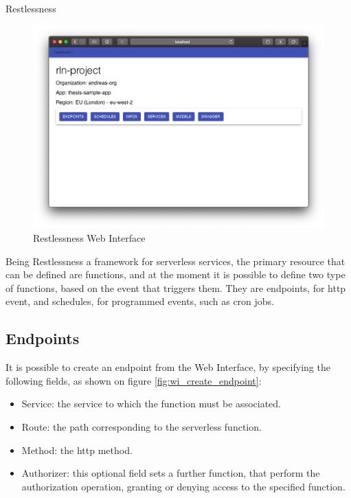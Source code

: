 \begin{chapter}{Restlessness}
    \begin{figure}
        \centering
        \includegraphics[width=\linewidth]{source/images/rln-web-interface.png}
        \caption{Restlessness Web Interface}
        \label{fig:rln_web_interface}
    \end{figure}

    Being Restlessness a framework for serverless services, the primary resource that
    can be defined are functions, and at the moment it is possible to define two type
    of functions, based on the event that triggers them. They are endpoints, for http
    event, and schedules, for programmed events, such as cron jobs.

    \subsection{Endpoints}
    \label{subsec:endpoints}
    It is possible to create an endpoint from the Web Interface, by specifying the
    following fields, as shown on figure \ref{fig:wi_create_endpoint}:
    \begin{itemize}
        \item Service: the service to which the function must be associated.
        \item Route: the path corresponding to the serverless function.
        \item Method: the http method.
        \item Authorizer: this optional field sets a further function, that
            perform the authorization operation, granting or denying access to
            the specified function. %
    \end{itemize}


\end{chapter}
